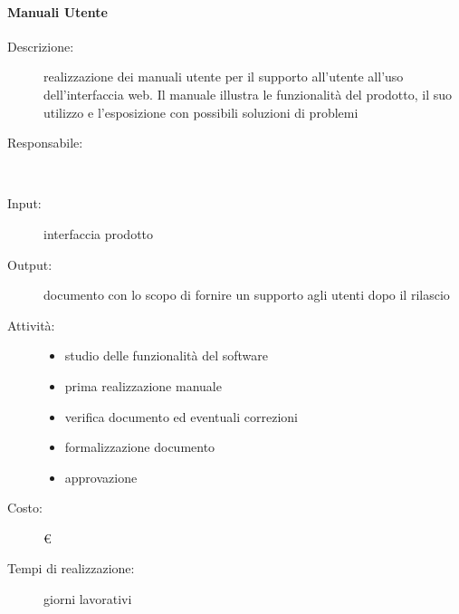 \paragraph{Manuali Utente}
\begin{description}
\item[Descrizione:] realizzazione dei manuali utente per il supporto all’utente all'uso dell'interfaccia web. Il manuale illustra le funzionalità del prodotto, il suo utilizzo e l’esposizione con possibili soluzioni di problemi \\

\item[Responsabile:] \\

\item[Input:] interfaccia prodotto \\

\item[Output:] documento con lo scopo di fornire un supporto agli utenti dopo il rilascio\\

\item[Attività:]
\begin{itemize}
\item studio delle funzionalità del software
\item prima realizzazione manuale
\item verifica documento ed eventuali correzioni
\item formalizzazione documento
\item approvazione
\end{itemize}
\item[Costo:] \euro \\
\item[Tempi di realizzazione:]  giorni lavorativi
\end{description}



